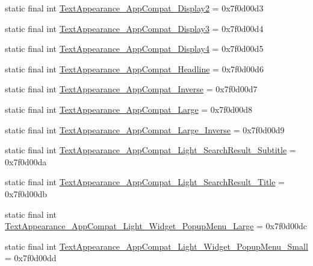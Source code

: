 \begin{DoxyCompactItemize}
\item 
static final int \mbox{\hyperlink{classandroid_1_1support_1_1v7_1_1appcompat_1_1R_1_1style_a636c4fa0b00194984dcf32557818d992}{Text\+Appearance\+\_\+\+App\+Compat\+\_\+\+Display2}} = 0x7f0d00d3
\item 
static final int \mbox{\hyperlink{classandroid_1_1support_1_1v7_1_1appcompat_1_1R_1_1style_a4bb50602a7395cbb4de22e4dd4c182c3}{Text\+Appearance\+\_\+\+App\+Compat\+\_\+\+Display3}} = 0x7f0d00d4
\item 
static final int \mbox{\hyperlink{classandroid_1_1support_1_1v7_1_1appcompat_1_1R_1_1style_af6a39a4f5ad54f4ff593b4c4e118b1ec}{Text\+Appearance\+\_\+\+App\+Compat\+\_\+\+Display4}} = 0x7f0d00d5
\item 
static final int \mbox{\hyperlink{classandroid_1_1support_1_1v7_1_1appcompat_1_1R_1_1style_aa40c94de107d982632d5f5cefb8af742}{Text\+Appearance\+\_\+\+App\+Compat\+\_\+\+Headline}} = 0x7f0d00d6
\item 
static final int \mbox{\hyperlink{classandroid_1_1support_1_1v7_1_1appcompat_1_1R_1_1style_a3b1f6191b46f580988a5d7ce1be8442e}{Text\+Appearance\+\_\+\+App\+Compat\+\_\+\+Inverse}} = 0x7f0d00d7
\item 
static final int \mbox{\hyperlink{classandroid_1_1support_1_1v7_1_1appcompat_1_1R_1_1style_a0f7c87ccc9f28664a827645d6c661adb}{Text\+Appearance\+\_\+\+App\+Compat\+\_\+\+Large}} = 0x7f0d00d8
\item 
static final int \mbox{\hyperlink{classandroid_1_1support_1_1v7_1_1appcompat_1_1R_1_1style_a1cd2cf2f498da3bce4450a09defe45cb}{Text\+Appearance\+\_\+\+App\+Compat\+\_\+\+Large\+\_\+\+Inverse}} = 0x7f0d00d9
\item 
static final int \mbox{\hyperlink{classandroid_1_1support_1_1v7_1_1appcompat_1_1R_1_1style_a2c3168595fbf5a2f2cd9d11b7f45ad30}{Text\+Appearance\+\_\+\+App\+Compat\+\_\+\+Light\+\_\+\+Search\+Result\+\_\+\+Subtitle}} = 0x7f0d00da
\item 
static final int \mbox{\hyperlink{classandroid_1_1support_1_1v7_1_1appcompat_1_1R_1_1style_a62fb7764d0faa33424e637094f9874ed}{Text\+Appearance\+\_\+\+App\+Compat\+\_\+\+Light\+\_\+\+Search\+Result\+\_\+\+Title}} = 0x7f0d00db
\item 
static final int \mbox{\hyperlink{classandroid_1_1support_1_1v7_1_1appcompat_1_1R_1_1style_a148472e911d0046b356b15cfc12dfa3a}{Text\+Appearance\+\_\+\+App\+Compat\+\_\+\+Light\+\_\+\+Widget\+\_\+\+Popup\+Menu\+\_\+\+Large}} = 0x7f0d00dc
\item 
static final int \mbox{\hyperlink{classandroid_1_1support_1_1v7_1_1appcompat_1_1R_1_1style_aab3ede0d3b744bbff6ea1fd27f8d6b3c}{Text\+Appearance\+\_\+\+App\+Compat\+\_\+\+Light\+\_\+\+Widget\+\_\+\+Popup\+Menu\+\_\+\+Small}} = 0x7f0d00dd

\end{DoxyCompactItemize}
